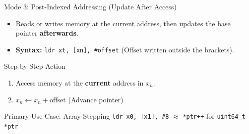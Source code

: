 \documentclass[aspectratio=169,11pt,t]{beamer}
\newcommand{\key}[1]{\textbf{#1}}
\newcommand{\code}[1]{\texttt{#1}}
\begin{document}
\begin{frame}{Mode 3: Post-Indexed Addressing (Update After Access)}

\begin{itemize}\setlength{\itemsep}{5pt}
  \item Reads or writes memory at the current address, then updates the base pointer \key{afterwards}.
  \item \key{Syntax:} \code{ldr xt, [xn], \#offset} \quad (Offset written outside the brackets).
\end{itemize}

\vspace{0.2cm}
\begin{block}{Step-by-Step Action}
\begin{enumerate}\setlength{\itemsep}{3pt}
  \item Access memory at the \key{current} address in $x_n$.
  \item $x_n \leftarrow x_n + \text{offset}$ \quad (Advance pointer)
\end{enumerate}
\end{block}

\vspace{0.25cm}
\begin{block}{Primary Use Case: Array Stepping}
\code{ldr x0, [x1], \#8} \quad $\approx$ \quad \code{*ptr++} for \code{uint64\_t *ptr} \\
\end{block}
\end{frame}

\end{document}
